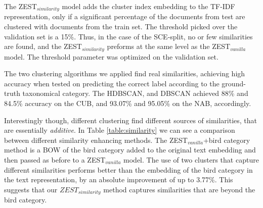\documentclass[11pt,a4paper]{article}
\newcommand\yuval[1]{\textcolor{darkpink}{\textbf{YUVAL:} #1 }}
\newcommand\reut[1]{\textcolor{green}{\textbf{REUT:} #1 }}
\begin{document}
The ZEST$_{similarity}$ model adds the cluster index embedding to the TF-IDF representation, only if a significant percentage of the documents from test are clustered with documents from the train set. The threshold picked over the validation set is a 15\%. 
Thus, in the case of the SCE-split, no or few similarities are found, and the ZEST$_{similarity}$ preforms at the same level as the ZEST$_{vanilla}$ model. %
The threshold parameter was optimized on the validation set. 




The two clustering algorithms we applied find real similarities, achieving high accuracy when tested on predicting the correct label according to the ground-truth taxonomical category. The HDBSCAN, and DBSCAN achieved 88\% and 84.5\% accuracy on the CUB, and 93.07\% and 95.05\% on the NAB, accordingly.

Interestingly though, different clustering find different sources of similarities, that are essentially {\em additive}. In Table \ref{table:similarity} we can see a comparison between different similarity enhancing methods. 
The ZEST$_{vanilla}$+bird category method is a BOW of the bird category added to the original text embedding and then passed as before to a ZEST$_{vanilla}$ model. 
The use of two clusters that capture different similarities performs better than the embedding of the bird category in the text representation, by an absolute improvement of up to 3.77\%. This suggests that our $ZEST_{similarity}$ method captures similarities that are beyond the bird category. %
\end{document}
